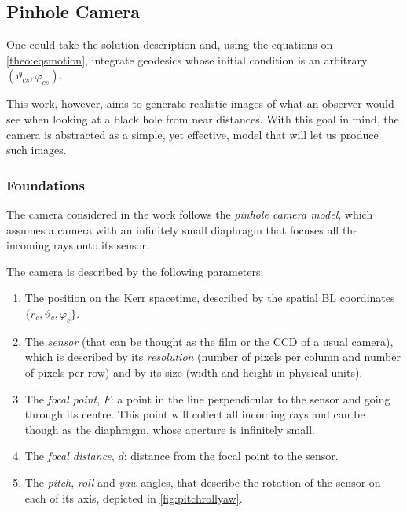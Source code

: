 \subsection{Pinhole Camera}
\label{sec:pinhole}

One could take the solution description and, using the equations on \autoref{theo:eqsmotion}, integrate geodesics whose initial condition is an arbitrary $(\vartheta_{cs}, \varphi_{cs})$.

This work, however, aims to generate realistic images of what an observer would see when looking at a black hole from near distances. With this goal in mind, the camera is abstracted as a simple, yet effective, model that will let us produce such images.

\subsubsection*{Foundations}

The camera considered in the work follows the \emph{pinhole camera model}, which assumes a camera with an infinitely small diaphragm that focuses all the incoming rays onto its sensor.

The camera is described by the following parameters:
\begin{enumerate}
	\item The position on the Kerr spacetime, described by the spatial \ac{BL} coordinates $\{r_c, \vartheta_c, \varphi_c\}$.
	\item The \emph{sensor} (that can be thought as the film or the CCD of a usual camera), which is described by its \emph{resolution} (number of pixels per column and number of pixels per row) and by its size (width and height in physical units).
	\item The \emph{focal point}, $F$: a point in the line perpendicular to the sensor and going through its centre. This point will collect all incoming rays and can be though as the diaphragm, whose aperture is infinitely small.
	\item The \emph{focal distance}, $d$: distance from the focal point to the sensor.
	\item The \emph{pitch}, \emph{roll} and \emph{yaw} angles, that describe the rotation of the sensor on each of its axis, depicted in \autoref{fig:pitchrollyaw}.
\end{enumerate}


